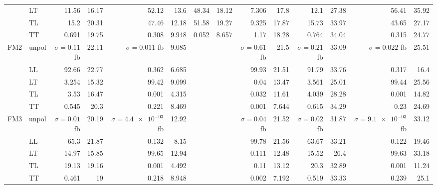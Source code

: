 \begin{table}[h]
{\begin{tabular}{llrrrrrrrrrrrr}
 & LT & \num{11.56} & \num{16.17} & \num{52.12} & \num{13.6} & \num{48.34} & \num{18.12} & \num{7.306} & \num{17.8} & \num{12.1} & \num{27.38} & \num{56.41} & \num{35.92} \\
 & TL & \num{15.2} & \num{20.31} & \num{47.46} & \num{12.18} & \num{51.58} & \num{19.27} & \num{9.325} & \num{17.87} & \num{15.73} & \num{33.97} & \num{43.65} & \num{27.17} \\
 & TT & \num{0.691} & \num{19.75} & \num{0.308} & \num{9.948} & \num{0.052} & \num{8.657} & \num{1.17} & \num{18.28} & \num{0.764} & \num{34.04} & \num{0.315} & \num{24.77} \\
\midrule
\multirow{5}{*}{FM2}
 & unpol & $\sigma = \num{0.11}$ fb & \num{22.11} & $\sigma = \num{0.011}$ fb & \num{9.085} &  &  & $\sigma = \num{0.61}$ fb & \num{21.5} & $\sigma = \num{0.21}$ fb & \num{33.09} & $\sigma = \num{0.022}$ fb & \num{25.51} \\
 & LL & \num{92.66} & \num{22.77} & \num{0.362} & \num{6.685} &  &  & \num{99.93} & \num{21.51} & \num{91.79} & \num{33.76} & \num{0.317} & \num{16.4} \\
 & LT & \num{3.254} & \num{15.32} & \num{99.42} & \num{9.099} &  &  & \num{0.04} & \num{13.47} & \num{3.561} & \num{25.01} & \num{99.44} & \num{25.56} \\
 & TL & \num{3.53} & \num{16.47} & \num{0.001} & \num{4.315} &  &  & \num{0.032} & \num{11.61} & \num{4.039} & \num{28.28} & \num{0.001} & \num{14.82} \\
 & TT & \num{0.545} & \num{20.3} & \num{0.221} & \num{8.469} &  &  & \num{0.001} & \num{7.644} & \num{0.615} & \num{34.29} & \num{0.23} & \num{24.69} \\
\midrule
\multirow{5}{*}{FM3}
 & unpol & $\sigma = \num{0.01}$ fb & \num{20.19} & $\sigma = \num{4.4e-03}$ fb & \num{12.92} &  &  & $\sigma = \num{0.04}$ fb & \num{21.52} & $\sigma = \num{0.02}$ fb & \num{31.87} & $\sigma = \num{9.1e-03}$ fb & \num{33.12} \\
 & LL & \num{65.3} & \num{21.87} & \num{0.132} & \num{8.15} &  &  & \num{99.78} & \num{21.56} & \num{63.67} & \num{33.21} & \num{0.122} & \num{19.46} \\
 & LT & \num{14.97} & \num{15.85} & \num{99.65} & \num{12.94} &  &  & \num{0.111} & \num{12.48} & \num{15.52} & \num{26.4} & \num{99.63} & \num{33.18} \\
 & TL & \num{19.13} & \num{19.16} & \num{0.001} & \num{4.492} &  &  & \num{0.11} & \num{13.12} & \num{20.3} & \num{32.89} & \num{0.001} & \num{11.24} \\
 & TT & \num{0.461} & \num{19} & \num{0.218} & \num{8.948} &  &  & \num{0.002} & \num{7.192} & \num{0.519} & \num{33.33} & \num{0.239} & \num{25.1} \\

\end{tabular}}
\end{table}

